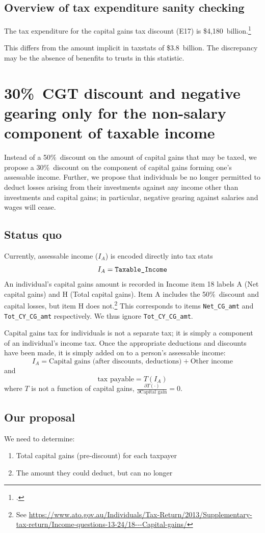 \documentclass{grattan}\usepackage[]{graphicx}\usepackage[]{color}
\begin{document}
\subsection{Overview of tax expenditure sanity checking}
The tax expenditure for the capital gains tax discount (E17) is \$4,180~billion.\footcite{TaxExpenditures201213} 


This differs from the amount implicit in taxstats of \$3.8~billion. The discrepancy may be the absence of benenfits to trusts in this statistic. 

\section{30\%\ CGT discount and negative gearing only for the non-salary component of taxable income}
Instead of a 50\%\ discount on the amount of capital gains that may be taxed, we propose a 30\%\ discount on the component of capital gains forming one's assessable income. Further, we propose that individuals be no longer permitted to deduct losses arising from their investments against any income other than investments and capital gains; in particular, negative gearing against salaries and wages will cease.
\subsection{Status quo}
Currently, assessable income ($I_A$) is encoded directly into tax stats
\[I_A = \verb=Taxable_Income=\]
An individual's capital gains amount is recorded in Income item 18 labels A (Net capital gains) and H (Total capital gains). Item A includes the 50\%\ discount and capital losses, but item H does not.\footnote{See \url{https://www.ato.gov.au/Individuals/Tax-Return/2013/Supplementary-tax-return/Income-questions-13-24/18---Capital-gains/}} This corresponds to items \verb=Net_CG_amt= and \verb=Tot_CY_CG_amt= respectively. We thus ignore \verb=Tot_CY_CG_amt=.

Capital gains tax for individuals is not a separate tax; it is simply a component of an individual's income tax. Once the appropriate deductions and discounts have been made, it is simply added on to a person's assessable income:
\[I_A = \text{Capital gains (after discounts, deductions)} + \text{Other income}\]
and
\[\text{tax payable} = T(I_A)\]
where $T$ is not a function of capital gains, $\frac{\partial T(\cdot)}{\partial \text{Capital gain}} = 0$.
%
\subsection{Our proposal}
We need to determine:
\begin{enumerate}
\item Total capital gains (pre-discount) for each taxpayer
\item The amount they could deduct, but can no longer
\end{enumerate}
\end{document}
